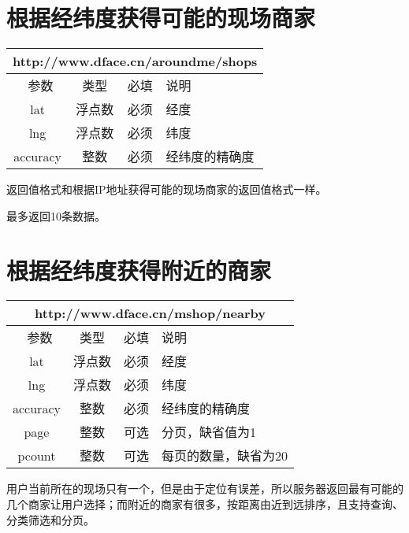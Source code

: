 \documentclass[cs4size]{ctexartutf8}
\begin{document}
\section{根据经纬度获得可能的现场商家}

\begin{table}[H]
   \begin{center}
\begin{tabular}{|c|c|c|p{12cm}|}
\hline
\multicolumn{4}{|c|}{http://www.dface.cn/aroundme/shops} \\
\hline\hline
 \  参数  & 类型 & 必填 &  说明  \\
\hline
 lat  & 浮点数 & 必须 & 经度\\
\hline
 lng  &  浮点数 & 必须 & 纬度\\ 
\hline
 accuracy  & 整数 & 必须 & 经纬度的精确度\\ 
\hline
\end{tabular}
   \end{center}
\end{table}

返回值格式和根据IP地址获得可能的现场商家的返回值格式一样。

最多返回10条数据。



\section{根据经纬度获得附近的商家}

\begin{table}[H]
   \begin{center}
\begin{tabular}{|c|c|c|p{12cm}|}
\hline
\multicolumn{4}{|c|}{http://www.dface.cn/mshop/nearby} \\
\hline\hline
 \  参数  & 类型 & 必填 &  说明  \\
\hline
 lat  & 浮点数 & 必须 & 经度\\
\hline
 lng  &  浮点数 & 必须 & 纬度\\ 
\hline
 accuracy  & 整数 & 必须 & 经纬度的精确度\\ 
 \hline
 page  & 整数 & 可选 & 分页，缺省值为1\\ 
 \hline
 pcount  & 整数 & 可选 & 每页的数量，缺省为20\\ 
\hline
\end{tabular}
   \end{center}
\end{table}

用户当前所在的现场只有一个，但是由于定位有误差，所以服务器返回最有可能的几个商家让用户选择；而附近的商家有很多，按距离由近到远排序，且支持查询、分类筛选和分页。
\end{document}
